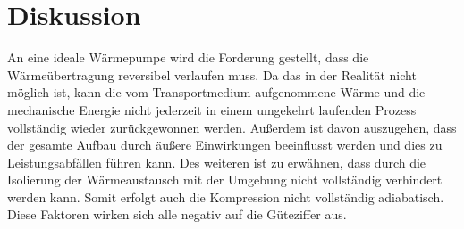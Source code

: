\section{Diskussion}
\label{sec:Diskussion}
An eine ideale Wärmepumpe wird die Forderung gestellt, dass die Wärmeübertragung reversibel verlaufen muss.
Da das in der Realität nicht möglich ist, kann die vom Transportmedium aufgenommene Wärme 
und die mechanische Energie nicht jederzeit in einem umgekehrt laufenden Prozess vollständig wieder zurückgewonnen werden.
Außerdem ist davon auszugehen, dass der gesamte Aufbau durch äußere Einwirkungen beeinflusst werden und dies zu Leistungsabfällen führen kann.
Des weiteren ist zu erwähnen, dass durch die Isolierung der Wärmeaustausch mit der Umgebung nicht vollständig verhindert werden kann. 
Somit erfolgt auch die Kompression nicht vollständig adiabatisch.
Diese Faktoren wirken sich alle negativ auf die Güteziffer aus.